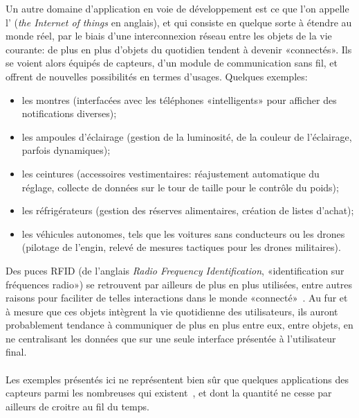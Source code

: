 Un autre domaine d'application en voie de développement est ce que l'on appelle l'\textit{} (\textit{the Internet of things} en anglais), et qui consiste en quelque sorte à étendre  au monde réel, par le biais d'une interconnexion réseau entre les objets de la vie courante: de plus en plus d'objets du quotidien tendent à devenir «connectés».
Ils se voient alors équipés de capteurs, d'un module de communication sans fil, et offrent de nouvelles possibilités en termes d'usages.
Quelques exemples:
\begin{itemize}
    \item les montres (interfacées avec les téléphones «intelligents» pour afficher des notifications diverses);
    \item les ampoules d'éclairage (gestion de la luminosité, de la couleur de l'éclairage, parfois dynamiques);
    \item les ceintures (accessoires vestimentaires: réajustement automatique du réglage, collecte de données sur le tour de taille pour le contrôle du poids);
    \item les réfrigérateurs (gestion des réserves alimentaires, création de listes d'achat);
    \item les véhicules autonomes, tels que les voitures sans conducteurs ou les drones (pilotage de l'engin, relevé de mesures tactiques pour les drones militaires).
\end{itemize}
Des puces RFID (de l'anglais \textit{Radio Frequency Identification}, «identification sur fréquences radio») se retrouvent par ailleurs de plus en plus utilisées, entre autres raisons pour faciliter de telles interactions dans le monde «connecté»~\cite{TW10}.
Au fur et à mesure que ces objets intègrent la vie quotidienne des utilisateurs, ils auront probablement tendance à communiquer de plus en plus entre eux, entre objets, en ne centralisant les données que sur une seule interface présentée à l'utilisateur final.

        \paragraph{}
Les exemples présentés ici ne représentent bien sûr que quelques applications des capteurs parmi les nombreuses qui existent~\cite{ASSC02}, et dont la quantité ne cesse par ailleurs de croitre au fil du temps.

